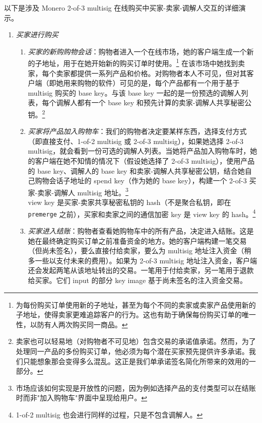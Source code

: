 以下是涉及 Monero 2-of-3 multisig 在线购买中买家-卖家-调解人交互的详细演示。
\begin{enumerate}
    \item {\em 买家进行购买}
    \begin{enumerate}
        \item {\em 买家的新购购物会话}：购物者进入一个在线市场，她的客户端生成一个新的子地址，用于在她开始新的购买订单时使用。\footnote{为每份购买订单使用新的子地址，甚至为每个不同的卖家或卖家产品使用新的子地址，使得卖家更难追踪客户的行为。这也有助于确保每份购买订单的唯一性，以防有人两次购买同一商品。} 在该市场中她找到卖家，每个卖家都提供一系列产品和价格。对购物者本人不可见，但对其客户端（即她用来购物的软件）可见的是，每个产品都有一个用于基于 multisig 购买的 base key。与该 base key 一起的是一份预选的调解人列表，每个调解人都有一个 base key 和预先计算的卖家-调解人共享秘密公钥。\footnote{卖家也可以轻易地（对购物者不可见地）包含交易的承诺值承诺。然而，为了处理同一产品的多份购买订单，他必须为每个潜在买家预先提供许多承诺。我们只能想象那会变得多么混乱。这正是我们单承诺签名简化所带来的效用的一部分。}
        \item {\em 买家将产品加入购物车}：我们的购物者决定要某样东西，选择支付方式（即直接支付、1-of-2 multisig 或 2-of-3 multisig），如果她选择 2-of-3 multisig，就会看到一份可选的调解人列表。当她将产品加入购物车时，她的客户端在她不知情的情况下（假设她选择了 2-of-3 multisig），使用产品的 base key、调解人的 base key 和卖家-调解人共享秘密公钥，结合她自己购物会话子地址的 spend key（作为她的 base key），构建一个 2-of-3 买家-卖家-调解人 multisig 地址。\footnote{市场应该如何实现是开放性的问题，因为例如选择产品的支付类型可以在结账时而非"加入购物车"界面中呈现给用户。}\\

        view key 是买家-卖家共享秘密私钥的 hash（不是聚合私钥，即在 {\tt premerge} 之前），买家和卖家之间的通信加密 key 是 view key 的 hash。\footnote{1-of-2 multisig 也会进行同样的过程，只是不包含调解人。}
        \item {\em 买家进入结账}：购物者查看她购物车中的所有产品，决定进入结账。这是她在最终确定购买订单之前准备资金的地方。她的客户端构建一笔交易（但尚未签名），要么直接付给卖家，要么为 multisig 地址注入资金（稍多一些以支付未来的费用）。如果为 2-of-3 multisig 地址注入资金，客户端还会发起两笔从该地址转出的交易。一笔用于付给卖家，另一笔用于退款给买家。它们 input 的部分 key image 基于尚未签名的注入资金交易。\\


\end{enumerate}
\end{enumerate}
